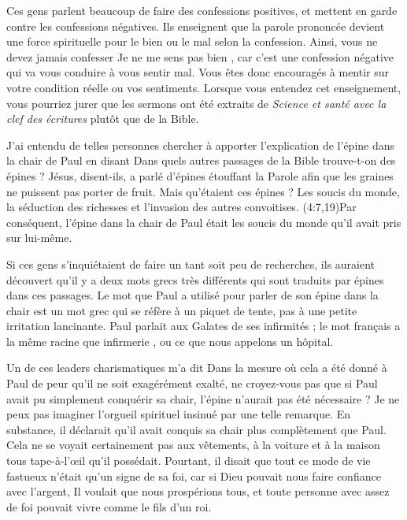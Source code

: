 Ces gens parlent beaucoup de faire des confessions positives,
 et mettent en garde contre les confessions négatives.
 Ils enseignent que la parole prononcée devient une force spirituelle
 pour le bien ou le mal selon la confession.
 Ainsi, vous ne devez jamais confesser\frcolon{} \Og Je ne me sens pas bien \Fg{},
 car c'est une confession négative qui va vous conduire à vous sentir mal.
 Vous êtes donc encouragés à mentir sur votre condition réelle
 ou vos sentiments. Lorsque vous entendez cet enseignement,
 vous pourriez jurer que les sermons ont été extraits
 de \emph{Science et santé avec la clef des écritures} plutôt que de la Bible.

J'ai entendu de telles personnes chercher à apporter l'explication
 de l'épine dans la chair de Paul en disant\frcolon{}
 \Og Dans quels autres passages de la Bible trouve-t-on des épines ?
 Jésus, disent-ils, a parlé d'épines étouffant la Parole afin
 que les graines ne puissent pas porter de fruit. \Fg{}
 Mais qu'étaient ces épines ? Les soucis du monde,
 la séduction des richesses et l'invasion des autres convoitises.
 (4:7,19)Par conséquent, l'épine dans la chair de Paul
 était les soucis du monde qu'il avait pris sur lui-même.

Si ces gens s'inquiétaient de faire un tant soit peu de recherches,
 ils auraient découvert qu'il y a deux mots grecs très différents
 qui sont traduits par \Og épines \Fg{} dans ces passages.
 Le mot que Paul a utilisé pour parler de son épine dans la chair
 est un mot grec qui se réfère à un piquet de tente,
 pas à une petite irritation lancinante.
 Paul parlait aux Galates de ses infirmités ;
 le mot français a la même racine que \Og infirmerie \Fg{},
 ou ce que nous appelons un hôpital.

Un de ces leaders charismatiques m'a dit\frcolon{}
 \Og Dans la mesure où cela a été donné à Paul de peur
 qu'il ne soit exagérément exalté, ne croyez-vous pas que si Paul
 avait pu simplement conquérir sa chair, l'épine n'aurait pas
 été nécessaire ? \Fg{}
 Je ne peux pas imaginer l'orgueil spirituel insinué par une telle remarque.
 En substance, il déclarait qu'il avait conquis sa chair
 plus complètement que Paul. Cela ne se voyait certainement pas
 aux vêtements, à la voiture et à la maison tous tape-à-l'œil
 qu'il possédait. Pourtant, il disait que tout ce mode de vie
 fastueux n'était qu'un signe de sa foi, car si Dieu pouvait nous faire
 confiance avec l'argent, Il voulait que nous prospérions tous,
 et toute personne avec assez de foi pouvait vivre comme le fils d'un roi.

